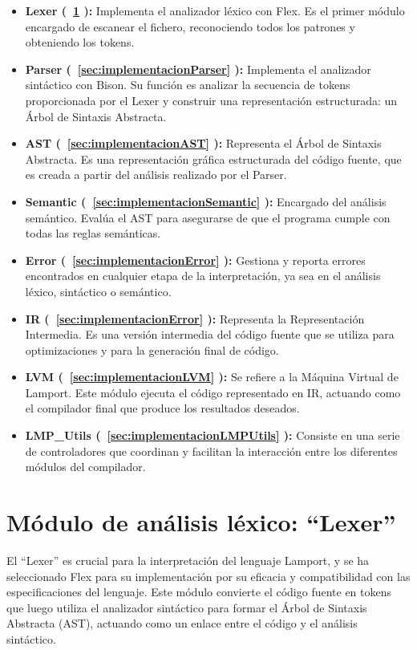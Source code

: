 \begin{itemize}
    \item \textbf{Lexer (~\ref{sec:implementacionLexer} ):} Implementa el analizador léxico con Flex. Es el primer módulo encargado de escanear el fichero, reconociendo todos los patrones y obteniendo los tokens.
    
    \item \textbf{Parser (~\ref{sec:implementacionParser} ):} Implementa el analizador sintáctico con Bison. Su función es analizar la secuencia de tokens proporcionada por el Lexer y construir una representación estructurada: un Árbol de Sintaxis Abstracta.
    
    \item \textbf{AST (~\ref{sec:implementacionAST} ):} Representa el Árbol de Sintaxis Abstracta. Es una representación gráfica estructurada del código fuente, que es creada a partir del análisis realizado por el Parser.
    
    \item \textbf{Semantic (~\ref{sec:implementacionSemantic} ):} Encargado del análisis semántico. Evalúa el AST para asegurarse de que el programa cumple con todas las reglas semánticas.
    
    \item \textbf{Error (~\ref{sec:implementacionError} ):} Gestiona y reporta errores encontrados en cualquier etapa de la interpretación, ya sea en el análisis léxico, sintáctico o semántico.
    
    \item \textbf{IR (~\ref{sec:implementacionError} ):} Representa la Representación Intermedia. Es una versión intermedia del código fuente que se utiliza para optimizaciones y para la generación final de código.
    
    \item \textbf{LVM (~\ref{sec:implementacionLVM} ):} Se refiere a la Máquina Virtual de Lamport. Este módulo ejecuta el código representado en IR, actuando como el compilador final que produce los resultados deseados.
    
    \item \textbf{LMP\_Utils (~\ref{sec:implementacionLMPUtils} ):} Consiste en una serie de controladores que coordinan y facilitan la interacción entre los diferentes módulos del compilador.
    
\end{itemize}

\section{Módulo de análisis léxico: ``Lexer''}\label{sec:implementacionLexer}
El ``Lexer'' es crucial para la interpretación del lenguaje Lamport, y se ha seleccionado Flex para su implementación por su eficacia y compatibilidad con las especificaciones del lenguaje. Este módulo convierte el código fuente en tokens que luego utiliza el analizador sintáctico para formar el Árbol de Sintaxis Abstracta (AST), actuando como un enlace entre el código y el análisis sintáctico.

